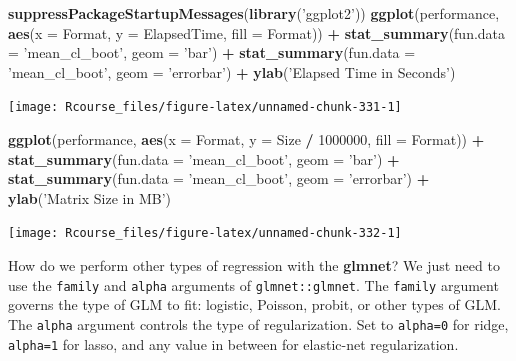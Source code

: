 \documentclass[]{book}
\newenvironment{Shaded}{\begin{snugshade}}{\end{snugshade}}
\newcommand{\KeywordTok}[1]{\textcolor[rgb]{0.13,0.29,0.53}{\textbf{#1}}}
\newcommand{\DataTypeTok}[1]{\textcolor[rgb]{0.13,0.29,0.53}{#1}}
\newcommand{\DecValTok}[1]{\textcolor[rgb]{0.00,0.00,0.81}{#1}}
\newcommand{\StringTok}[1]{\textcolor[rgb]{0.31,0.60,0.02}{#1}}
\newcommand{\OperatorTok}[1]{\textcolor[rgb]{0.81,0.36,0.00}{\textbf{#1}}}
\newcommand{\NormalTok}[1]{#1}
\theoremstyle{definition}
\theoremstyle{definition}
\theoremstyle{definition}
\theoremstyle{remark}
\begin{document}
\begin{Shaded}
\begin{Highlighting}[]
\KeywordTok{suppressPackageStartupMessages}\NormalTok{(}\KeywordTok{library}\NormalTok{(}\StringTok{'ggplot2'}\NormalTok{))}
\KeywordTok{ggplot}\NormalTok{(performance, }\KeywordTok{aes}\NormalTok{(}\DataTypeTok{x =}\NormalTok{ Format, }\DataTypeTok{y =}\NormalTok{ ElapsedTime, }\DataTypeTok{fill =}\NormalTok{ Format)) }\OperatorTok{+}
\StringTok{  }\KeywordTok{stat_summary}\NormalTok{(}\DataTypeTok{fun.data =} \StringTok{'mean_cl_boot'}\NormalTok{, }\DataTypeTok{geom =} \StringTok{'bar'}\NormalTok{) }\OperatorTok{+}
\StringTok{  }\KeywordTok{stat_summary}\NormalTok{(}\DataTypeTok{fun.data =} \StringTok{'mean_cl_boot'}\NormalTok{, }\DataTypeTok{geom =} \StringTok{'errorbar'}\NormalTok{) }\OperatorTok{+}
\StringTok{  }\KeywordTok{ylab}\NormalTok{(}\StringTok{'Elapsed Time in Seconds'}\NormalTok{) }
\end{Highlighting}
\end{Shaded}

\texttt{[image: Rcourse\_files/figure-latex/unnamed-chunk-331-1]}

\begin{Shaded}
\begin{Highlighting}[]
\KeywordTok{ggplot}\NormalTok{(performance, }\KeywordTok{aes}\NormalTok{(}\DataTypeTok{x =}\NormalTok{ Format, }\DataTypeTok{y =}\NormalTok{ Size }\OperatorTok{/}\StringTok{ }\DecValTok{1000000}\NormalTok{, }\DataTypeTok{fill =}\NormalTok{ Format)) }\OperatorTok{+}
\StringTok{  }\KeywordTok{stat_summary}\NormalTok{(}\DataTypeTok{fun.data =} \StringTok{'mean_cl_boot'}\NormalTok{, }\DataTypeTok{geom =} \StringTok{'bar'}\NormalTok{) }\OperatorTok{+}
\StringTok{  }\KeywordTok{stat_summary}\NormalTok{(}\DataTypeTok{fun.data =} \StringTok{'mean_cl_boot'}\NormalTok{, }\DataTypeTok{geom =} \StringTok{'errorbar'}\NormalTok{) }\OperatorTok{+}
\StringTok{  }\KeywordTok{ylab}\NormalTok{(}\StringTok{'Matrix Size in MB'}\NormalTok{) }
\end{Highlighting}
\end{Shaded}

\texttt{[image: Rcourse\_files/figure-latex/unnamed-chunk-332-1]}

How do we perform other types of regression with the \textbf{glmnet}? We
just need to use the \texttt{family} and \texttt{alpha} arguments of
\texttt{glmnet::glmnet}. The \texttt{family} argument governs the type
of GLM to fit: logistic, Poisson, probit, or other types of GLM. The
\texttt{alpha} argument controls the type of regularization. Set to
\texttt{alpha=0} for ridge, \texttt{alpha=1} for lasso, and any value in
between for elastic-net regularization.
\end{document}
